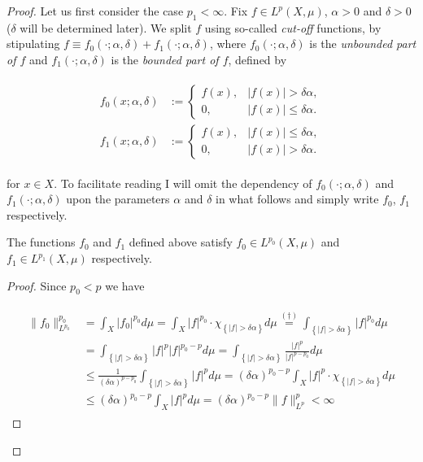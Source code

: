 \begin{proof}
Let us first consider the case \underline{$p_1 < \infty$}. Fix $f \in L^p(X,\mu)$, $\alpha > 0$ and $\delta > 0$ ($\delta$ will be determined later). We split $f$ using so-called \emph{cut-off} functions, by stipulating $f \equiv f_0(\cdot;\alpha,\delta) + f_1(\cdot;\alpha,\delta)$, where $f_0(\cdot;\alpha,\delta)$ is the \emph{unbounded part of $f$} and $f_1(\cdot;\alpha,\delta)$ is the \emph{bounded part of $f$}, defined by

\begin{gather}
	\begin{aligned}
		f_0(x;\alpha,\delta) &:= \begin{cases}
			f(x), & \vert f(x) \vert > \delta \alpha,\\
			0, & \vert f(x)\vert \leqslant \delta \alpha.
		\end{cases}\\
		f_1(x;\alpha,\delta) &:= \begin{cases}
			f(x), & \vert f(x) \vert \leqslant \delta \alpha,\\
			0, & \vert f(x)\vert > \delta \alpha.
		\end{cases}
	\end{aligned}
	\label{eq:cut_off}
\end{gather}

for $x \in X$. To facilitate reading I will omit the dependency of $f_0(\cdot;\alpha,\delta)$ and $f_1(\cdot;\alpha,\delta)$ upon the parameters $\alpha$ and $\delta$ in what follows and simply write $f_0$, $f_1$ respectively. 
	
\begin{lemma}
The functions $f_0$ and $f_1$ defined above satisfy $f_0 \in L^{p_0}(X,\mu)$ and $f_1 \in L^{p_1}(X,\mu)$ respectively.
\label{lem:f0f1}
\end{lemma}
	
\begin{proof}
Since $p_0 < p$ we have 

\begin{gather}
	\begin{aligned}
		\|f_0\|^{p_0}_{L^{p_0}} &= \int_{X} \vert f_0\vert^{p_0} d\mu =\int_{X} \vert f \vert^{p_0} \cdot \chi_{\left\{\vert f\vert > \delta\alpha \right\}} d\mu \overset{(\dagger)}{=} \int_{\left\{\vert f \vert > \delta\alpha \right\}} \vert f \vert^{p_0}d\mu\\ 
		&= \int_{\left\{\vert f\vert > \delta\alpha \right\}} \vert f \vert^p \vert f \vert^{p_0 - p} d\mu = \int_{\left\{\vert f\vert > \delta\alpha \right\}} \frac{\vert f \vert^p}{\vert f \vert^{p - p_0}} d\mu\\
		&\leqslant \frac{1}{(\delta\alpha)^{p - p_0}} \int_{\left\{\vert f\vert > \delta\alpha \right\}} \vert f \vert^p d\mu = (\delta\alpha)^{p_0 - p} \int_{X} \vert f \vert^p \cdot \chi_{\left\{\vert f\vert > \delta\alpha \right\}} d\mu\\
		& \leqslant (\delta\alpha)^{p_0 - p} \int_{X} \vert f \vert^p d\mu = (\delta\alpha)^{p_0 - p} \|f\|^p_{L^p} < \infty
	\end{aligned}
	\label{est:f0}
\end{gather}


\end{proof}
\end{proof}
